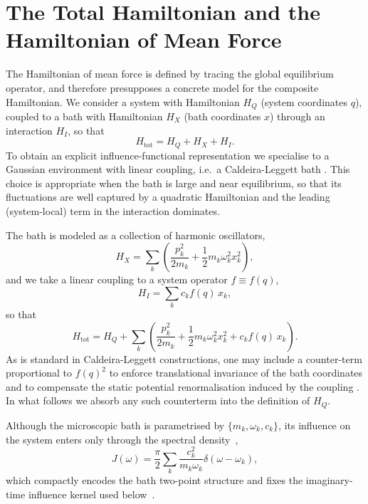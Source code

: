 \section{\label{sec:model}The Total Hamiltonian and the Hamiltonian of Mean Force}
The Hamiltonian of mean force is defined by tracing the global equilibrium
operator, and therefore presupposes a concrete model for the composite
Hamiltonian. We consider a system with Hamiltonian $H_Q$ (system coordinates
$q$), coupled to a bath with Hamiltonian $H_X$ (bath coordinates $x$) through an
interaction $H_I$, so that
\begin{equation}
    H_{\mathrm{tot}}=H_Q+H_X+H_I.
    \label{eq:Htot_model}
\end{equation}
To obtain an explicit influence-functional representation we specialise to a
Gaussian environment with linear coupling, i.e.\ a Caldeira-Leggett bath \cite{caldeiraQuantumTunnellingDissipative1983a}. This
choice is appropriate when the bath is large and near equilibrium, so that its
fluctuations are well captured by a quadratic Hamiltonian and the leading
(system-local) term in the interaction dominates.

The bath is modeled as a collection of harmonic oscillators,
\begin{equation}
    H_X=\sum_k\left(\frac{p_k^2}{2m_k}+\frac{1}{2}m_k\omega_k^2 x_k^2\right),
    \label{eq:HX_model}
\end{equation}
and we take a linear coupling to a system operator $f\equiv f(q)$,
\begin{equation}
    H_I=\sum_k c_k f(q)\, x_k,
    \label{eq:HI_model}
\end{equation}
so that
\begin{equation}
    H_{\mathrm{tot}} = H_Q + \sum_k \left( \frac{p_k^2}{2m_k} + \frac{1}{2}m_k\omega_k^2 x_k^2 + c_k f(q)\, x_k \right).
    \label{eq:Htot_full}
\end{equation}
As is standard in Caldeira-Leggett constructions, one may include a counter-term
proportional to $f(q)^2$ to enforce translational invariance of the bath
coordinates and to compensate the static potential renormalisation induced by
the coupling \cite{caldeiraQuantumTunnellingDissipative1983a}. In what follows we absorb any such counterterm into the
definition of $H_Q$.

Although the microscopic bath is parametrised by $\{m_k,\omega_k,c_k\}$, its
influence on the system enters only through the spectral density~\cite{weissQuantumDissipativeSystems2012, breuerTheoryOpenQuantum2002},
\begin{equation}
    J(\omega) = \frac{\pi}{2} \sum_k \frac{c_k^2}{m_k \omega_k} \delta(\omega-\omega_k),
    \label{eq:spectral_density}
\end{equation}
which compactly encodes the bath two-point structure and fixes the imaginary-time influence kernel used below~\cite{feynmanTheoryGeneralQuantum1963a}.

